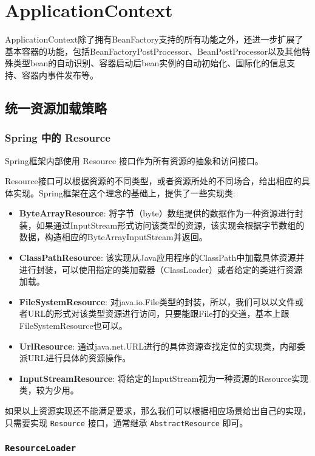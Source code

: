 \section{ApplicationContext}

ApplicationContext除了拥有BeanFactory支持的所有功能之外，还进一步扩展了基本容器的功能，包括BeanFactoryPostProcessor、BeanPostProcessor以及其他特殊类型bean的自动识别、容器启动后bean实例的自动初始化、国际化的信息支持、容器内事件发布等。

\subsection{统一资源加载策略}

\subsubsection{Spring 中的 Resource}

Spring框架内部使用 Resource 接口作为所有资源的抽象和访问接口。

Resource接口可以根据资源的不同类型，或者资源所处的不同场合，给出相应的具体实现。Spring框架在这个理念的基础上，提供了一些实现类:

\begin{itemize}
    \item \textbf{ByteArrayResource}: 将字节（byte）数组提供的数据作为一种资源进行封装，如果通过InputStream形式访问该类型的资源，该实现会根据字节数组的数据，构造相应的ByteArrayInputStream并返回。
    \item \textbf{ClassPathResource}: 该实现从Java应用程序的ClassPath中加载具体资源并进行封装，可以使用指定的类加载器（ClassLoader）或者给定的类进行资源加载。
    \item \textbf{FileSystemResource}: 对java.io.File类型的封装，所以，我们可以以文件或者URL的形式对该类型资源进行访问，只要能跟File打的交道，基本上跟FileSystemResource也可以。
    \item \textbf{UrlResource}: 通过java.net.URL进行的具体资源查找定位的实现类，内部委派URL进行具体的资源操作。
    \item \textbf{InputStreamResource}: 将给定的InputStream视为一种资源的Resource实现类，较为少用。
\end{itemize}

如果以上资源实现还不能满足要求，那么我们可以根据相应场景给出自己的实现，只需要实现 \texttt{Resource} 接口，通常继承 \texttt{AbstractResource} 即可。

\subsubsection{\texttt{ResourceLoader}}

